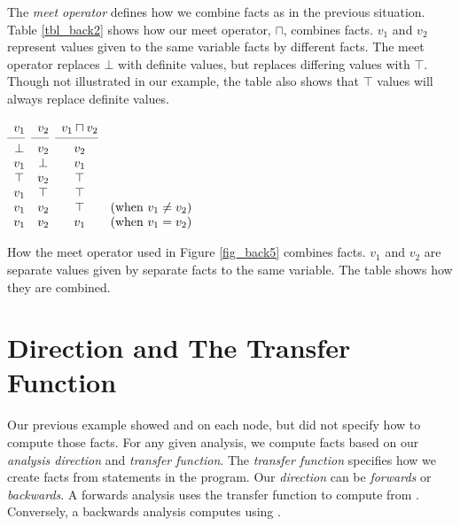 \documentclass[12pt]{report}
\begin{document}
The \emph{meet operator} defines how we combine facts as in the
previous situation. Table \ref{tbl_back2} shows how our meet operator,
$\sqcap$, combines facts. $v_1$ and $v_2$ represent values given to
the same variable facts by different facts. The meet operator replaces
$\bot$ with definite values, but replaces differing values with
$\top$. Though not illustrated in our example, the table also shows
that $\top$ values will always replace definite values.

\begin{table}[tbh]
  \centering
  \figbegin
  \begin{math}
    \begin{array}{cccc}
      v_1 & v_2 & v_1 \sqcap v_2 \\
      \cmidrule(r){1-1}\cmidrule(r){2-2}\cmidrule(r){3-3}
      \bot & v_2 & v_2 & \\ 
      v_1 & \bot & v_1 & \\
      \top & v_2 & \top & \\
      v_1 & \top & \top  &\\
      v_1 & v_2 & \top & \text{(when $v_1 \neq v_2$)}\\
      v_1 & v_2 & v_1 & \text{(when $v_1 = v_2$)}
    \end{array}
  \end{math}
  \caption{How the meet operator used in
    Figure \ref{fig_back5} combines facts. $v_1$ and $v_2$ are
    separate values given by separate facts to the same variable. The
    table shows how they are combined.}
  \label{tbl_back2}
  \figend
\end{table}

\section{Direction and The Transfer Function}
\label{sec_back5}
Our previous example showed \inE and \out on each
node, but did not specify how to compute those facts. For any given
analysis, we compute facts based on our \emph{analysis direction} and
\emph{transfer function}. The \emph{transfer function} specifies how we 
create facts from statements in the program. Our \emph{direction} can 
be \emph{forwards} or \emph{backwards}. A forwards analysis uses 
the transfer function to compute \out from \inE. Conversely,
a backwards analysis computes \inE using \out. 
\end{document}
